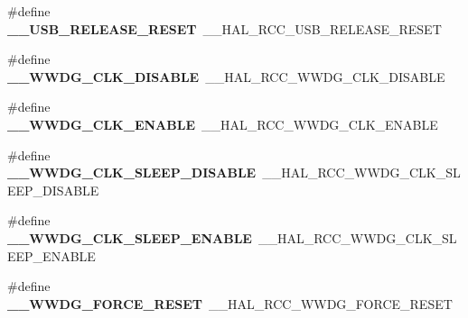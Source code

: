 \begin{DoxyCompactItemize}
\item 
\#define {\bfseries \+\_\+\+\_\+\+U\+S\+B\+\_\+\+R\+E\+L\+E\+A\+S\+E\+\_\+\+R\+E\+S\+ET}~\+\_\+\+\_\+\+H\+A\+L\+\_\+\+R\+C\+C\+\_\+\+U\+S\+B\+\_\+\+R\+E\+L\+E\+A\+S\+E\+\_\+\+R\+E\+S\+ET\hypertarget{group___h_a_l___r_c_c___aliased_ga6fb50c3ef9ee8429bcded2b41c75a55e}{}\label{group___h_a_l___r_c_c___aliased_ga6fb50c3ef9ee8429bcded2b41c75a55e}

\item 
\#define {\bfseries \+\_\+\+\_\+\+W\+W\+D\+G\+\_\+\+C\+L\+K\+\_\+\+D\+I\+S\+A\+B\+LE}~\+\_\+\+\_\+\+H\+A\+L\+\_\+\+R\+C\+C\+\_\+\+W\+W\+D\+G\+\_\+\+C\+L\+K\+\_\+\+D\+I\+S\+A\+B\+LE\hypertarget{group___h_a_l___r_c_c___aliased_ga17c18790ccc24f556cd518f5c8ba26ec}{}\label{group___h_a_l___r_c_c___aliased_ga17c18790ccc24f556cd518f5c8ba26ec}

\item 
\#define {\bfseries \+\_\+\+\_\+\+W\+W\+D\+G\+\_\+\+C\+L\+K\+\_\+\+E\+N\+A\+B\+LE}~\+\_\+\+\_\+\+H\+A\+L\+\_\+\+R\+C\+C\+\_\+\+W\+W\+D\+G\+\_\+\+C\+L\+K\+\_\+\+E\+N\+A\+B\+LE\hypertarget{group___h_a_l___r_c_c___aliased_ga57311d1dc58aaf3d021286cc3bbb9d29}{}\label{group___h_a_l___r_c_c___aliased_ga57311d1dc58aaf3d021286cc3bbb9d29}

\item 
\#define {\bfseries \+\_\+\+\_\+\+W\+W\+D\+G\+\_\+\+C\+L\+K\+\_\+\+S\+L\+E\+E\+P\+\_\+\+D\+I\+S\+A\+B\+LE}~\+\_\+\+\_\+\+H\+A\+L\+\_\+\+R\+C\+C\+\_\+\+W\+W\+D\+G\+\_\+\+C\+L\+K\+\_\+\+S\+L\+E\+E\+P\+\_\+\+D\+I\+S\+A\+B\+LE\hypertarget{group___h_a_l___r_c_c___aliased_gac6fa67df82ed82aaafc18a52a39a65a2}{}\label{group___h_a_l___r_c_c___aliased_gac6fa67df82ed82aaafc18a52a39a65a2}

\item 
\#define {\bfseries \+\_\+\+\_\+\+W\+W\+D\+G\+\_\+\+C\+L\+K\+\_\+\+S\+L\+E\+E\+P\+\_\+\+E\+N\+A\+B\+LE}~\+\_\+\+\_\+\+H\+A\+L\+\_\+\+R\+C\+C\+\_\+\+W\+W\+D\+G\+\_\+\+C\+L\+K\+\_\+\+S\+L\+E\+E\+P\+\_\+\+E\+N\+A\+B\+LE\hypertarget{group___h_a_l___r_c_c___aliased_gafe0cf8a80f682f75863f2058608d0567}{}\label{group___h_a_l___r_c_c___aliased_gafe0cf8a80f682f75863f2058608d0567}

\item 
\#define {\bfseries \+\_\+\+\_\+\+W\+W\+D\+G\+\_\+\+F\+O\+R\+C\+E\+\_\+\+R\+E\+S\+ET}~\+\_\+\+\_\+\+H\+A\+L\+\_\+\+R\+C\+C\+\_\+\+W\+W\+D\+G\+\_\+\+F\+O\+R\+C\+E\+\_\+\+R\+E\+S\+ET\hypertarget{group___h_a_l___r_c_c___aliased_ga3f066c5b3d2b225967ac2417dae6d569}{}\label{group___h_a_l___r_c_c___aliased_ga3f066c5b3d2b225967ac2417dae6d569}


\end{DoxyCompactItemize}

